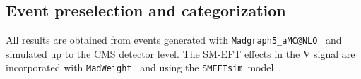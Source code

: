 \documentclass[a4paper,11pt]{article}
\newcommand{\Pb}{{{\Pqb}}\xspace}
\newcommand{\PAb}{{{{\Paqb}}}\xspace}
\renewcommand{\PV}{{{{V}}}\xspace}
\newcommand{\VH}{{{\PV}{\PH}}\xspace}
\begin{document}

\subsection{Event preselection and categorization}

%
All results are obtained from events generated with \texttt{Madgraph5\_aMC@NLO}~\cite{Alwall:2014hca} and simulated up to the CMS detector level. 
The SM-EFT effects in the \VH signal are incorporated with \texttt{MadWeight}~\cite{Artoisenet:2008zz} and using the \texttt{SMEFTsim}~model~\cite{Brivio:2017btx}.
\end{document}
